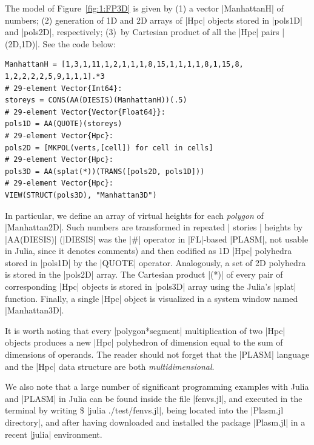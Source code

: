 \begin{coding} 
\label{example:1:Manhattan3D}

The model of Figure~\ref{fig:1:FP3D} is given by (1) a vector |ManhattanH| of numbers; (2) generation of 1D and 2D arrays of |Hpc| objects stored in |pols1D| and |pols2D|, respectively; (3)~by Cartesian product of all the |Hpc| pairs |(2D,1D)|. See the code below:

\begin{lstlisting}[language=JuliaLocal, style=julia, mathescape = true] 
ManhattanH = [1,3,1,11,1,2,1,1,1,8,15,1,1,1,1,8,1,15,8, 1,2,2,2,2,5,9,1,1,1].*3
# 29-element Vector{Int64}:
storeys = CONS(AA(DIESIS)(ManhattanH))(.5)
# 29-element Vector{Vector{Float64}}:
pols1D = AA(QUOTE)(storeys)
# 29-element Vector{Hpc}:
pols2D = [MKPOL(verts,[cell]) for cell in cells]
# 29-element Vector{Hpc}:
pols3D = AA(splat(*))(TRANS([pols2D, pols1D]))
# 29-element Vector{Hpc}:
VIEW(STRUCT(pols3D), "Manhattan3D")
\end{lstlisting}


In particular, we define an array of virtual heights for each \emph{polygon} of |Manhattan2D|. Such numbers are transformed in repeated | stories | heights by |AA(DIESIS)| (|DIESIS| was the |#| operator in |FL|-based |PLASM|, not usable in Julia, since it denotes comments) and then codified as 1D |Hpc| polyhedra stored in |pols1D| by the |QUOTE| operator. Analogously, a set of 2D polyhedra is stored in the |pols2D| array. The Cartesian product |(*)| of every pair of corresponding |Hpc| objects is stored in |pols3D| array using the Julia’s |splat| function. Finally, a single |Hpc| object is visualized in a system window named |Manhattan3D|. 

It is worth noting that every |polygon*segment| multiplication of two |Hpc| objects produces a new |Hpc| polyhedron of dimension equal to the sum of dimensions of operands.
The reader should not forget that the |PLASM| language and the |Hpc| data structure are both  \emph{multidimensional}.

We also note that a large number of significant programming examples with Julia and |PLASM| in Julia can be found inside the file |fenvs.jl|, and executed in the terminal by writing \$ |julia ./test/fenvs.jl|, being located into the |Plasm.jl directory|, and after having downloaded and installed the package |Plasm.jl| in a recent |julia| environment.
\end{coding}

